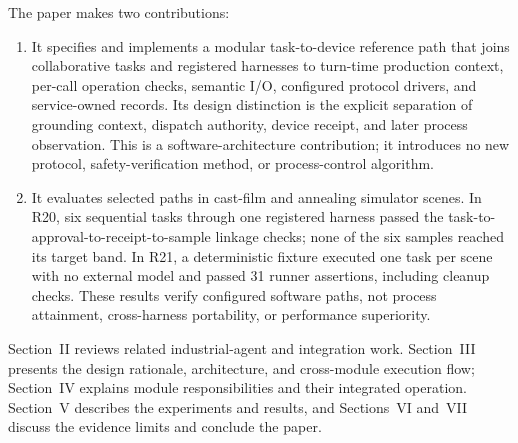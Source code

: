 The paper makes two contributions:
\begin{enumerate}
\item It specifies and implements a modular task-to-device reference path that
  joins collaborative tasks and registered harnesses to turn-time production
  context, per-call operation checks, semantic I/O, configured protocol
  drivers, and service-owned records. Its design distinction is the explicit
  separation of grounding context, dispatch authority, device receipt, and
  later process observation. This is a software-architecture contribution; it
  introduces no new protocol, safety-verification method, or process-control
  algorithm.
\item It evaluates selected paths in cast-film and annealing simulator scenes.
  In R20, six sequential tasks through one registered harness passed the
  task-to-approval-to-receipt-to-sample linkage checks; none of the six samples
  reached its target band. In R21, a deterministic fixture executed one task
  per scene with no external model and passed 31 runner assertions, including
  cleanup checks. These results verify configured software paths, not process
  attainment, cross-harness portability, or performance superiority.
\end{enumerate}

Section~II reviews related industrial-agent and integration work.
Section~III presents the design rationale, architecture, and cross-module
execution flow; Section~IV explains module responsibilities and their
integrated operation. Section~V describes the experiments and results, and
Sections~VI and~VII discuss the evidence limits and conclude the paper.
